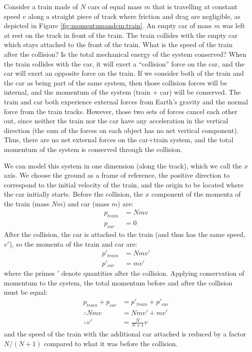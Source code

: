 \begin{example}{ 
Consider a train made of $N$ cars of equal mass $m$ that is travelling at constant speed $v$ along a straight piece of track where friction and drag are negligible, as depicted in Figure \ref{fig:momentumandcm:train}. An empty car of mass $m$ was left at rest on the track in front of the train. The train collides with the empty car which stays attached to the front of the train. What is the speed of the train after the collision? Is the total mechanical energy of the system conserved?}
When the train collides with the car, it will exert a ``collision'' force on the car, and the car will exert an opposite force on the train. If we consider both of the train and the car as being part of the same system, then those collision forces will be internal, and the momentum of the system (train + car) will be conserved. The train and car both experience external forces from Earth's gravity and the normal force from the train tracks. However, those two sets of forces cancel each other out, since neither the train nor the car have any acceleration in the vertical direction (the sum of the forces on each object has no net vertical component). Thus, there are no net external forces on the car+train system, and the total momentum of the system is conserved through the collision.

We can model this system in one dimension (along the track), which we call the $x$ axis. We choose the ground as a frame of reference, the positive direction to correspond to the initial velocity of the train, and the origin to be located where the car initially starts. Before the collision, the $x$ component of the momenta of the train (mass $Nm$) and car (mass $m$) are:
\begin{align*}
p_{train}&=Nmv\\
p_{car}&=0
\end{align*}
After the collision, the car is attached to the train (and thus has the same speed, $v'$), so the momenta of the train and car are:
\begin{align*}
p'_{train}&=Nmv'\\
p'_{car}&=mv'
\end{align*}
where the primes $'$ denote quantities after the collision. Applying conservation of momentum to the system, the total momentum before and after the collision must be equal:
\begin{align*}
p_{train}+p_{car}&=p'_{train}+p'_{car}\\
\therefore Nmv &= Nmv' +mv'\\
\therefore v' &=\frac{N}{N+1}v
\end{align*}
and the speed of the train with the additional car attached is reduced by a factor $N/(N+1)$ compared to what it was before the collision.


\end{example}
